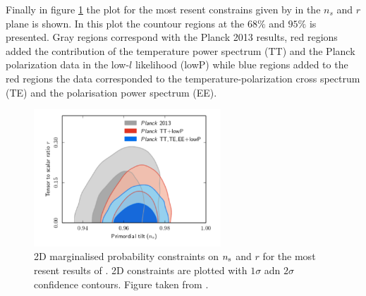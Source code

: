 \documentclass{rmaa}
\begin{document}
Finally in figure \ref{fig:infla_2} the plot for the most resent constrains given by \citep{PlanckC} in the $n_s$ and $r$ plane is shown. In this plot the countour regions at the $68\%$ and $95\%$ is presented. Gray regions correspond with the Planck 2013 results, red regions added the contribution of the temperature power spectrum (TT) and the Planck polarization data in the low-$l$ likelihood (lowP) while blue regions added to the red regions the data corresponded to the temperature-polarization cross spectrum (TE) and the polarisation power spectrum (EE).

\begin{figure}[h!]
 \begin{center}
 \includegraphics[width=7cm]{planckres}
\caption{2D marginalised probability constraints on $n_{\rm s}$ and $r$ for
the most resent results of \citep{PlanckC}. 2D constraints are plotted with $1\sigma$ adn $2\sigma$
confidence contours. Figure taken from \citep{PlanckC}.
}\label{fig:infla_2}
\end{center}
\end{figure}	


\end{document}
